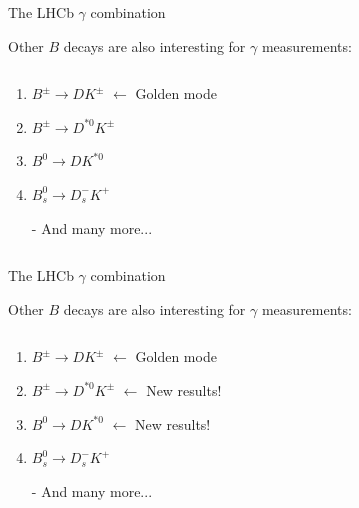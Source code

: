 \documentclass[dvipsnames]{beamer}
\begin{document}
\begin{frame}{The LHCb $\gamma$ combination}
  \begin{center}
    \Large Other $B$ decays are also interesting for $\gamma$ measurements:
  \end{center}
  \vspace{0.2cm}
  \begin{columns}
    \begin{column}{0.6\textwidth}
      \vspace{1.5cm}
      \begin{enumerate}
        \item{$B^\pm\to DK^\pm$ $\leftarrow$ Golden mode}
        \item{$B^\pm\to D^{*0}K^\pm$}
        \item{$B^0\to DK^{*0}$}
        \item{$B_s^0\to D_s^-K^+$}
        \item[-]{And many more...}
      \end{enumerate}
      \vspace{1.5cm}
    \end{column}
    \begin{column}{0.4\textwidth}
    \end{column}
  \end{columns}
\end{frame}

\begin{frame}{The LHCb $\gamma$ combination}
  \begin{center}
    \Large Other $B$ decays are also interesting for $\gamma$ measurements:
  \end{center}
  \vspace{0.2cm}
  \begin{columns}
    \begin{column}{0.6\textwidth}
      \vspace{1.5cm}
      \begin{enumerate}
        \item{$B^\pm\to DK^\pm$ $\leftarrow$ Golden mode}
        \item{$B^\pm\to D^{*0}K^\pm$ $\leftarrow$ New results!}
        \item{$B^0\to DK^{*0}$ $\leftarrow$ New results!}
        \item{$B_s^0\to D_s^-K^+$}
        \item[-]{And many more...}
      \end{enumerate}
      \vspace{1.5cm}
    \end{column}
    \begin{column}{0.4\textwidth}
    \end{column}
  \end{columns}
\end{frame}
\end{document}
